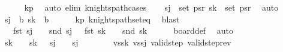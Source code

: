\begin{isabellebody}
\ \ \ \ \isamarkupfalse%
\ kp\ \isamarkupfalse%
\ {\isacharparenleft}{\kern0pt}auto\ elim{\isacharcolon}{\kern0pt}\ knights{\isacharunderscore}{\kern0pt}path{\isachardot}{\kern0pt}cases{\isacharparenright}{\kern0pt}\isanewline
\isanewline
\ \ \isamarkupfalse%
\ {\isachardoublequoteopen}s\isactrlsub j\ {\isasymin}\ set\ ps\isactrlsub r{\isachardoublequoteclose}\ {\isachardoublequoteopen}s\isactrlsub k\ {\isasymin}\ set\ ps\isactrlsub r{\isachardoublequoteclose}\ \isamarkupfalse%
\ auto\isanewline
\ \ \isamarkupfalse%
\ \isamarkupfalse%
\ {\isachardoublequoteopen}s\isactrlsub j\ {\isasymin}\ {\isacharquery}{\kern0pt}b{\isachardoublequoteclose}\ {\isachardoublequoteopen}s\isactrlsub k\ {\isasymin}\ {\isacharquery}{\kern0pt}b{\isachardoublequoteclose}\isanewline
\ \ \ \ \isamarkupfalse%
\ kp\ knights{\isacharunderscore}{\kern0pt}path{\isacharunderscore}{\kern0pt}set{\isacharunderscore}{\kern0pt}eq\ \isamarkupfalse%
\ blast{\isacharplus}{\kern0pt}\isanewline
\ \ \isamarkupfalse%
\ \isamarkupfalse%
\ {\isachardoublequoteopen}{}\ {\isacharless}{\kern0pt}\ fst\ s\isactrlsub j\ {\isasymand}\ {}\ {\isacharless}{\kern0pt}\ snd\ s\isactrlsub j{\isachardoublequoteclose}\ {\isachardoublequoteopen}{}\ {\isacharless}{\kern0pt}\ fst\ s\isactrlsub k\ {\isasymand}\ {}\ {\isacharless}{\kern0pt}\ snd\ s\isactrlsub k{\isachardoublequoteclose}\isanewline
\ \ \ \ \isamarkupfalse%
\ board{\isacharunderscore}{\kern0pt}def\ \isamarkupfalse%
\ auto\isanewline
\ \ \isamarkupfalse%
\ \isamarkupfalse%
\ {\isachardoublequoteopen}s\isactrlsub k\ {\isacharequal}{\kern0pt}\ {\isacharparenleft}{\kern0pt}{}{\isacharcomma}{\kern0pt}{}{\isacharparenright}{\kern0pt}\ {\isasymor}\ s\isactrlsub k\ {\isacharequal}{\kern0pt}\ {\isacharparenleft}{\kern0pt}{}{\isacharcomma}{\kern0pt}{}{\isacharparenright}{\kern0pt}{\isachardoublequoteclose}\ {\isachardoublequoteopen}s\isactrlsub j\ {\isacharequal}{\kern0pt}\ {\isacharparenleft}{\kern0pt}{}{\isacharcomma}{\kern0pt}{}{\isacharparenright}{\kern0pt}\ {\isasymor}\ s\isactrlsub j\ {\isacharequal}{\kern0pt}\ {\isacharparenleft}{\kern0pt}{}{\isacharcomma}{\kern0pt}{}{\isacharparenright}{\kern0pt}{\isachardoublequoteclose}\isanewline
\ \ \ \ \isamarkupfalse%
\ vs{\isacharunderscore}{\kern0pt}s\isactrlsub k\ vs{\isacharunderscore}{\kern0pt}s\isactrlsub j\ valid{\isacharunderscore}{\kern0pt}step{\isacharunderscore}{\kern0pt}{}{\isacharunderscore}{\kern0pt}{}\ valid{\isacharunderscore}{\kern0pt}step{\isacharunderscore}{\kern0pt}rev\ \isamarkupfalse%

\end{isabellebody}
